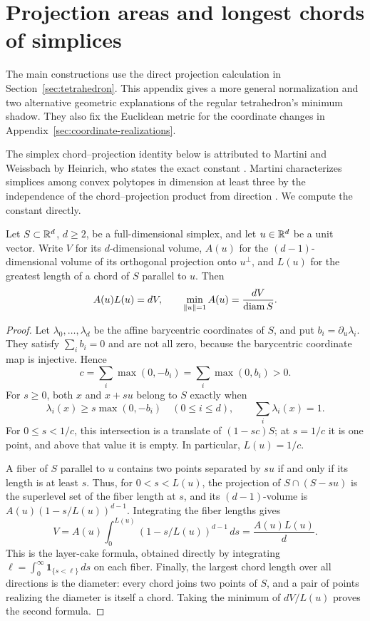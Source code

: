 \section{Projection areas and longest chords of simplices}
\label{sec:projections}

The main constructions use the direct projection calculation in
Section~\ref{sec:tetrahedron}. This appendix gives a more general
normalization and two alternative geometric explanations of the regular
tetrahedron's minimum shadow. They also fix the Euclidean metric for the
coordinate changes in Appendix~\ref{sec:coordinate-realizations}.

The simplex chord--projection identity below is attributed to Martini and
Weissbach \cite{MartiniWeissbach1992} by Heinrich, who states the exact
constant \cite[p.~8268]{Heinrich2014}. Martini characterizes simplices
among convex polytopes in dimension at least three by the independence
of the chord--projection product from direction
\cite[Theorem~2(C)]{Martini1991}. We compute the constant directly.

\begin{proposition}
\label{prop:simplex}
Let $S\subset\mathbb R^d$, $d\ge2$, be a full-dimensional simplex, and let
$u\in\mathbb R^d$ be a unit vector. Write $V$ for its $d$-dimensional volume,
$A(u)$ for the $(d-1)$-dimensional volume of its orthogonal projection
onto $u^\perp$, and $L(u)$ for the greatest length of a chord of $S$
parallel to $u$. Then
\[
 A(u)L(u)=dV,\qquad
 \min_{\lVert u\rVert=1}A(u)=\frac{dV}{\operatorname{diam}S}.
\]
\end{proposition}
\begin{proof}
Let $\lambda_0,\ldots,\lambda_d$ be the affine barycentric coordinates
of $S$, and put $b_i=\partial_u\lambda_i$. They satisfy
$\sum_i b_i=0$ and are not all zero, because the barycentric coordinate
map is injective. Hence
\[
 c=\sum_i\max(0,-b_i)=\sum_i\max(0,b_i)>0.
\]
For $s\ge0$, both $x$ and $x+su$ belong to $S$ exactly when
\[
 \lambda_i(x)\ge s\max(0,-b_i)\quad(0\le i\le d),
 \qquad \sum_i\lambda_i(x)=1.
\]
For $0\le s<1/c$, this intersection is a translate of $(1-sc)S$;
at $s=1/c$ it is one point, and above that value it is empty.
In particular, $L(u)=1/c$.

A fiber of $S$ parallel to $u$ contains two points separated by $su$
if and only if its length is at least $s$. Thus, for $0<s<L(u)$,
the projection of $S\cap(S-su)$ is the superlevel set of the fiber
length at $s$, and its $(d-1)$-volume is
$A(u)(1-s/L(u))^{d-1}$. Integrating the fiber lengths gives
\[
 V=A(u)\int_0^{L(u)}(1-s/L(u))^{d-1}\,ds
   =\frac{A(u)L(u)}{d}.
\]
This is the layer-cake formula, obtained directly by integrating
$\ell=\int_0^\infty\mathbf1_{\{s<\ell\}}\,ds$ on each fiber.
Finally, the largest chord length over all directions is the diameter:
every chord joins two points of $S$, and a pair of points realizing
the diameter is itself a chord. Taking the minimum of $dV/L(u)$
proves the second formula.
\end{proof}

